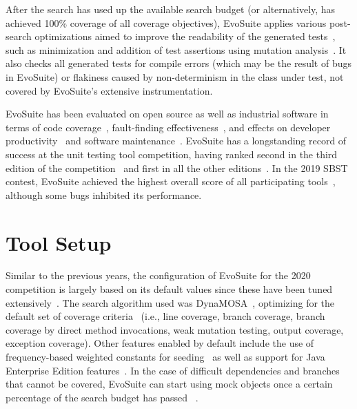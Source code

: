 \documentclass[sigconf]{acmart}
\newcommand{\EVOSUITE}{{\sc EvoSuite}\xspace}
\begin{document}
After the search has used up the available search budget (or alternatively, has
achieved 100\% coverage of all coverage objectives), \EVOSUITE applies various
post-search optimizations aimed to improve the readability of the generated
tests~\cite{FrA11c,FrA13a}, such as minimization and addition of test assertions using mutation
analysis~\cite{10.1109/TSE.2011.93}. It also checks all generated tests for compile errors (which may be the result of bugs in \EVOSUITE) or flakiness caused by non-determinism in the class under test, not covered by \EVOSUITE's extensive instrumentation.


\EVOSUITE has been evaluated on open
source as well as industrial software in terms of code
coverage~\cite{fraser2014large,emse_archive,ea_evaluation,dynamosa},
fault-finding
effectiveness~\cite{shamshiri2015automatically,moein2017}, and effects
on developer productivity~\cite{TOSEM_userstudy,ISSTA15_Study} and
software maintenance~\cite{ICST2018_Maintenance}.
%
\EVOSUITE has a longstanding record of success at the unit testing tool
competition, having ranked second in the third edition of the
competition~\cite{evosuiteAtSbst2015} and first in all the other
editions~\cite{evosuiteAtSbst2013,evosuiteAtFittest2013,evosuiteAtSbst2016,evosuiteAtSbst2017,evosuiteAtSbst2018}. In the 2019 SBST contest, \EVOSUITE
achieved the highest overall score of all participating tools~\cite{evosuiteAtSbst2019}, 
although some bugs inhibited its performance.


\section{Tool Setup}


Similar to the previous years, the configuration of \EVOSUITE for the 2020
competition is largely based on its default values since these have been tuned
extensively~\cite{arcuri2013parameter}. 
%
The search algorithm used was DynaMOSA~\cite{dynamosa}, optimizing for the
default set of coverage criteria~\cite{rojas2015combining} (i.e., line
coverage, branch coverage, branch coverage by direct method invocations, weak
mutation testing, output coverage, exception coverage).
%
Other features enabled by default include the use of frequency-based weighted
constants for seeding~\cite{sakti2015instance} as well as support for Java
Enterprise Edition features~\cite{arcuri2016java}. In the case of difficult dependencies and branches that cannot be covered, \EVOSUITE can start using mock objects once a certain percentage of the search
budget has passed~\cite{ICST_Mocking17} . 
\end{document}
